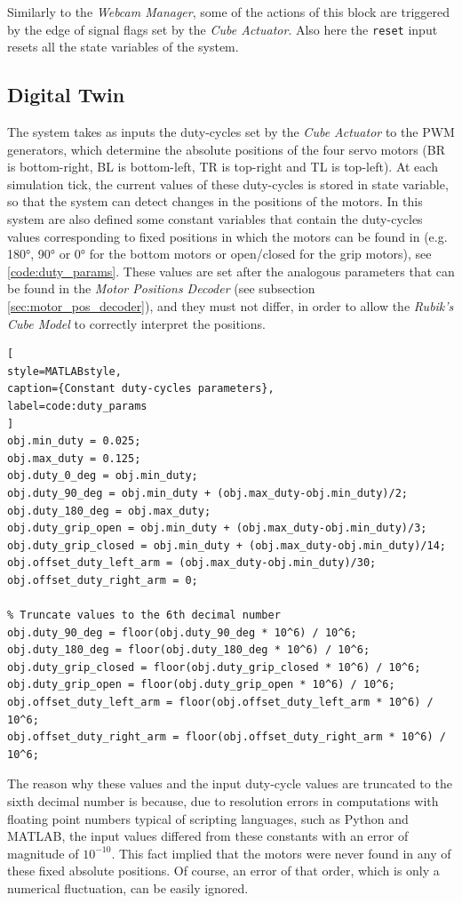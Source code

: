 \documentclass{report}
\begin{document}
Similarly to the \textit{Webcam Manager}, some of the actions of this block are triggered by the edge of signal flags set by the \textit{Cube Actuator}. Also here the \texttt{reset} input resets all the state variables of the system.

\subsection{Digital Twin}\label{sec:digital-twin}
The system takes as inputs the duty-cycles set by the \textit{Cube Actuator} to the PWM generators, which determine the absolute positions of the four servo motors (BR is bottom-right, BL is bottom-left, TR is top-right and TL is top-left). At each simulation tick, the current values of these duty-cycles is stored in state variable, so that the system can detect changes in the positions of the motors. In this system are also defined some constant variables that contain the duty-cycles values corresponding to fixed positions in which the motors can be found in (e.g. 180°, 90° or 0° for the bottom motors or open/closed for the grip motors), see \ref{code:duty_params}. These values are set after the analogous parameters that can be found in the \textit{Motor Positions Decoder} (see subsection \ref{sec:motor_pos_decoder}), and they must not differ, in order to allow the \textit{Rubik's Cube Model} to correctly interpret the positions.

\begin{lstlisting}[
style=MATLABstyle,
caption={Constant duty-cycles parameters},
label=code:duty_params
]
obj.min_duty = 0.025;
obj.max_duty = 0.125;
obj.duty_0_deg = obj.min_duty;
obj.duty_90_deg = obj.min_duty + (obj.max_duty-obj.min_duty)/2;
obj.duty_180_deg = obj.max_duty;
obj.duty_grip_open = obj.min_duty + (obj.max_duty-obj.min_duty)/3;
obj.duty_grip_closed = obj.min_duty + (obj.max_duty-obj.min_duty)/14;
obj.offset_duty_left_arm = (obj.max_duty-obj.min_duty)/30;
obj.offset_duty_right_arm = 0;

% Truncate values to the 6th decimal number
obj.duty_90_deg = floor(obj.duty_90_deg * 10^6) / 10^6;
obj.duty_180_deg = floor(obj.duty_180_deg * 10^6) / 10^6;
obj.duty_grip_closed = floor(obj.duty_grip_closed * 10^6) / 10^6;
obj.duty_grip_open = floor(obj.duty_grip_open * 10^6) / 10^6;
obj.offset_duty_left_arm = floor(obj.offset_duty_left_arm * 10^6) / 10^6;
obj.offset_duty_right_arm = floor(obj.offset_duty_right_arm * 10^6) / 10^6;
\end{lstlisting}

The reason why these values and the input duty-cycle values are truncated to the sixth decimal number is because, due to resolution errors in computations with floating point numbers typical of scripting languages, such as Python and MATLAB, the input values differed from these constants with an error of magnitude of \(10^{-10}\).
This fact implied that the motors were never found in any of these fixed absolute positions. Of course, an error of that order, which is only a numerical fluctuation, can be easily ignored.
\end{document}
